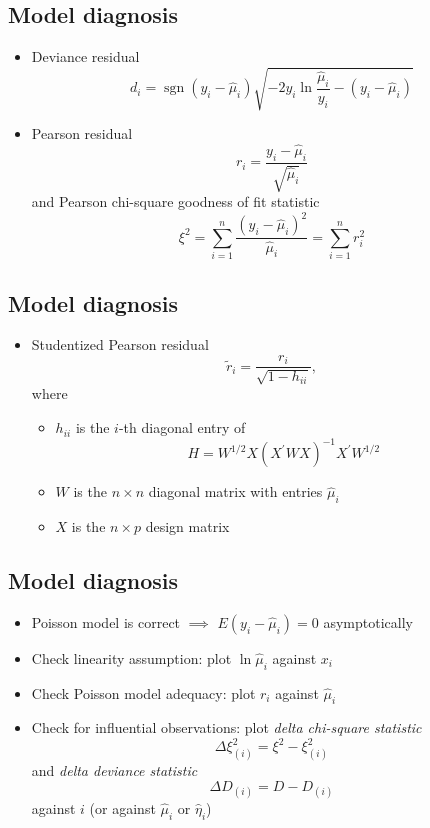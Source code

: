 \documentclass[]{article}
\providecommand{\tightlist}{%
  \setlength{\itemsep}{0pt}\setlength{\parskip}{0pt}}
\begin{document}
\subsection{Model diagnosis}\label{model-diagnosis-1}

\begin{itemize}
\tightlist
\item
  Deviance residual \[
  d_{i}=\operatorname{sgn}\left(  y_{i}-\hat{\mu}_{i}\right)  \sqrt{-2y_{i}
  \ln\frac{\hat{\mu}_{i}}{y_{i}}-\left(  y_{i}-\hat{\mu}_{i}\right)  }
  \]
\item
  Pearson residual \[
  r_{i}=\frac{y_{i}-\hat{\mu}_{i}}{\sqrt{\hat{\mu}_{i}}}
  \] and Pearson chi-square goodness of fit statistic \[
  \xi^{2}=\sum_{i=1}^{n}\frac{\left(  y_{i}-\hat{\mu}_{i}\right)  ^{2}}{\hat
  {\mu}_{i}}=\sum_{i=1}^{n}r_{i}^{2}
  \]
\end{itemize}

\subsection{Model diagnosis}\label{model-diagnosis-2}

\begin{itemize}
\tightlist
\item
  Studentized Pearson residual \[
  \tilde{r}_{i}=\frac{r_{i}}{\sqrt{1-h_{ii}}},
  \] where

  \begin{itemize}
  \item
    \(h_{ii}\) is the \(i\)-th diagonal entry of \[
    H=W^{1/2}X\left(  X^{\prime}WX\right)  ^{-1}X^{\prime}W^{1/2}
    \]
  \item
    \(W\) is the \(n\times n\) diagonal matrix with entries
    \(\hat{\mu}_{i}\)
  \item
    \(X\) is the \(n\times p\) design matrix
  \end{itemize}
\end{itemize}

\subsection{Model diagnosis}\label{model-diagnosis-3}

\begin{itemize}
\item
  Poisson model is correct \(\implies\)
  \(E\left( y_{i}-\hat{\mu}_{i}\right) =0\) asymptotically
\item
  Check linearity assumption: plot \(\ln\hat{\mu}_{i}\) against
  \(x_{i}\)
\item
  Check Poisson model adequacy: plot \(r_{i}\) against \(\hat{\mu}_{i}\)
\item
  Check for influential observations: plot \emph{delta chi-square
  statistic} \[
  \Delta\xi_{\left(  i\right)  }^{2}=\xi^{2}-\xi_{\left(  i\right)  }^{2}
  \] and \emph{delta deviance statistic} \[
  \Delta D_{\left(  i\right)  }=D-D_{\left(  i\right)  }
  \] against \(i\) (or against \(\hat{\mu}_{i}\) or \(\hat{\eta}_{i}\))
\end{itemize}
\end{document}
